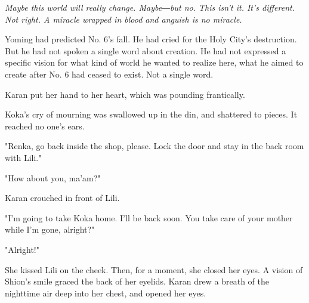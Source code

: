 \emph{Maybe this world will really change. Maybe―but no. This isn't it. It's
different. Not right. A miracle wrapped in blood and anguish is no
miracle.}

Yoming had predicted No. 6's fall. He had cried for the Holy City's
destruction. But he had not spoken a single word about creation. He had
not expressed a specific vision for what kind of world he wanted to
realize here, what he aimed to create after No. 6 had ceased to exist.
Not a single word.

Karan put her hand to her heart, which was pounding frantically.

Koka's cry of mourning was swallowed up in the din, and shattered to
pieces. It reached no one's ears.

"Renka, go back inside the shop, please. Lock the door and stay in the
back room with Lili."

"How about you, ma'am?"

Karan crouched in front of Lili.

"I'm going to take Koka home. I'll be back soon. You take care of your
mother while I'm gone, alright?"

"Alright!"

She kissed Lili on the cheek. Then, for a moment, she closed her eyes. A
vision of Shion's smile graced the back of her eyelids. Karan drew a
breath of the nighttime air deep into her chest, and opened her eyes.